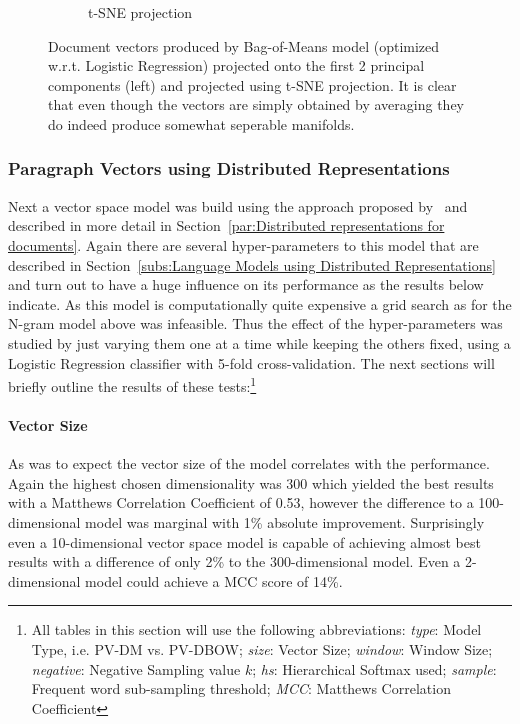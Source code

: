 \begin{figure}[h]
\begin{subfigure}[b]{0.48\textwidth}
      \caption{t-SNE projection}
\label{fig:bom-tsne}
    \end{subfigure}
    \caption{Document vectors produced by Bag-of-Means model (optimized w.r.t. Logistic Regression) projected onto the first 2 principal components (left) and projected using t-SNE projection. It is clear that even though the vectors are simply obtained by averaging they do indeed produce somewhat seperable manifolds.}
\label{fig:bom}
\end{figure}

\subsubsection{Paragraph Vectors using Distributed Representations}

Next a vector space model was build using the approach proposed by~\cite{Le:2014aa} and described in more detail in Section~\ref{par:Distributed representations for documents}. Again there are several hyper-parameters to this model that are described in Section~\ref{subs:Language Models using Distributed Representations} and turn out to have a huge influence on its performance as the results below indicate. As this model is computationally quite expensive a grid search as for the N-gram model above was infeasible. Thus the effect of the hyper-parameters was studied by just varying them one at a time while keeping the others fixed, using a Logistic Regression classifier with 5-fold cross-validation.
The next sections will briefly outline the results of these tests:\footnote{All tables in this section will use the following abbreviations: \emph{type}: Model Type, i.e. PV-DM vs. PV-DBOW; \emph{size}: Vector Size; \emph{window}: Window Size; \emph{negative}: Negative Sampling value $k$; \emph{hs}: Hierarchical Softmax used; \emph{sample}: Frequent word sub-sampling threshold; \emph{MCC}: Matthews Correlation Coefficient}

\paragraph{Vector Size}
As was to expect the vector size of the model correlates with the performance. Again the highest chosen dimensionality was 300 which yielded the best results with a Matthews Correlation Coefficient of 0.53, however the difference to a 100-dimensional model was marginal with 1\% absolute improvement. Surprisingly even a 10-dimensional vector space model is capable of achieving almost best results with a difference of only 2\% to the 300-dimensional model. Even a 2-dimensional model could achieve a MCC score of 14\%.

